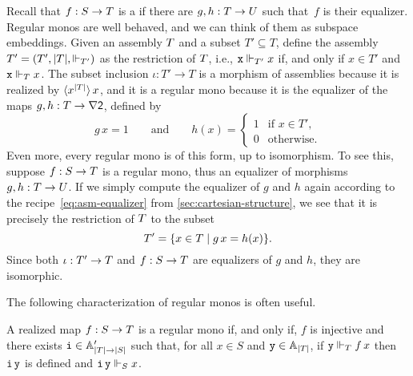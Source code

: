Recall that $f : \asm{S} \to \asm{T}$ is a  if
there are $g, h : \asm{T} \to \asm{U}$ such that~$f$ is their
equalizer. Regular monos are well behaved, and we can think of them as
subspace embeddings. Given an assembly $\asm{T}$ and a subset $T'
\subseteq T$, define the assembly $\asm{T}' = (T', |T|, {\rz[T']})$
as the restriction of $\asm{T}$, i.e., $\R{x} \rz[T'] x$ if, and only
if $x \in T'$ and $\R{x} \rz[T] x$. The subset inclusion $\iota : T'
\to T$ is a morphism of assemblies because it is realized by
$\tpcalam{x}{|T|} x$, and it is a regular mono because it is
the equalizer of the maps $g, h : T \to \nabla \two$, defined by
%
\begin{equation*}
  g\,x = 1
  \qquad\text{and}\qquad
  h(x) =
  \begin{cases}
    1 & \text{if $x \in T'$,}\\
    0 & \text{otherwise}.
  \end{cases}
\end{equation*}
%
Even more, every regular mono is of this form, up to isomorphism. To
see this, suppose $f : \asm{S} \to \asm{T}$ is a regular mono, thus an
equalizer of morphisms $g, h : \asm{T} \to \asm{U}$. If we simply
compute the equalizer of $g$ and $h$ again according to the
recipe~\eqref{eq:asm-equalizer} from
\cref{sec:cartesian-structure}, we see that it is precisely the
restriction of $\asm{T}$ to the subset
% 
\begin{equation*}
  T' = \set{x \in T \such g\,x = h(x)}.
\end{equation*}
% 
Since both $\iota : \asm{T}' \to \asm{T}$ and $f : \asm{S} \to
\asm{T}$ are equalizers of $g$ and $h$, they are isomorphic.

The following characterization of regular monos is often useful.

\begin{proposition}
  \label{prop:reg-mono-when}%
  A realized map $f : \asm{S} \to \asm{T}$ is a regular mono if, and
  only if, $f$ is injective and there exists $\R{i} \in \subAtyp{|T|
    \to |S|}$ such that, for all $x \in S$ and $\R{y} \in \Atyp{|T|}$,
  if $\R{y} \rz[T] f\,x$ then $\R{i}\,\R{y}$ is defined and
  $\R{i}\,\R{y} \rz[S] x$.
\end{proposition}

